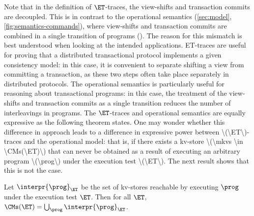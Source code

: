 Note that in the definition of \(\ET\)-traces, the view-shifts and 
transaction commits are decoupled. This is in contrast to the
operational semantics (\cref{sec:model}, \cref{fig:semantics-commands}), 
where view-shifts and transaction commits are combined in a single transition of programs (). 
The reason for this mismatch is best understood when looking at the
intended applications. 
ET-traces are useful for 
proving that a distributed transactional 
protocol implements a given consistency model: in this case, it is convenient to separate shifting a view from committing a transaction, 
as these two steps often take place separately in distributed
protocols. The operational semantics  is particularly useful for  reasoning about transactional 
programs: in this case, the treatment of the view-shifts and transaction commits as a single transition reduces the number of interleavings in programs.
The \(\ET\)-traces and operational semantics are equally expressive as
the following theorem states. 
\ac{One may wonder whether this difference in approach leads to a difference in expressive power between \(\ET\)-traces 
and the operational model: that is, if there exists a kv-store \(\mkvs \in \CMs(\ET)\) that can never be obtained as a 
result of executing an arbitrary program \(\prog\) under the execution test \(\ET\). The next result shows that 
this is not the case.}
%

\begin{theorem}
	\label{thm:ettraces2sem}
	Let \(\interpr{\prog}_{\ET}\) be the set of kv-stores reachable by executing \(\prog\) under the execution test \(\ET\). 
    Then for all \(\ET\), \(\CMs(\ET) = \bigcup_{\prog} \interpr{\prog}_{\ET}\).
\end{theorem}

